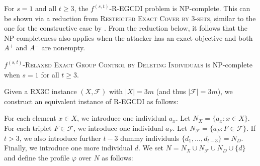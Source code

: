\documentclass[
    12pt,               %
    a4paper,            %
    bibtotoc,           %
    pointlessnumbers,   %
    ngerman,            %
    titlepage,          %
    leqno,              %
    ]{scrarticle}       %
\begin{document}
For $s=1$ and all $t \geq 3$, the $f^{(s, t)}$-R-EGCDI problem is NP-complete. This can be shown via a reduction from \textsc{Restricted Exact Cover by 3-sets}, similar to the one for the constructive case by \textcite[Theorem 4]{YD18}. From the reduction below, it follows that the NP-completeness also applies when the attacker has an exact objective and both $A^+$ and $A^-$ are nonempty.

\begin{Theorem} \label{thm:f1t_regcdi_npc}
$f^{(s, t)}$-\textsc{Relaxed Exact Group Control by Deleting Individuals} is NP-complete when $s=1$ for all $t \geq 3$.
\end{Theorem}

\begin{Proof}
Given a RX3C instance $(X, \mathcal{F})$ with $|X|=3m$ (and thus $|\mathcal{F}|=3m$), we construct an equivalent instance of R-EGCDI as follows:

For each element $x \in X$, we introduce one individual $a_x$. Let $N_X = \{ a_x : x \in X \}$. For each triplet $F \in \mathcal{F}$, we introduce one individual $a_F$. Let $N_\mathcal{F} = \{ a_F : F \in \mathcal{F} \}$. If $t > 3$, we also introduce further $t-3$ dummy individuals $\{ d_1, \ldots, d_{t-3} \} = N_D$. Finally, we introduce one more individual $d$. We set $N = N_X \cup N_\mathcal{F} \cup N_D \cup \{d\}$ and define the profile $\varphi$ over $N$ as follows:


\end{Proof}
\end{document}
